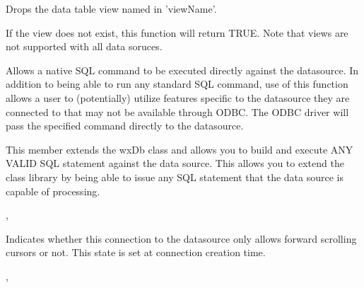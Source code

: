 \label{wxdbdropview}


Drops the data table view named in 'viewName'.




If the view does not exist, this function will return TRUE.  Note that views are not supported with all data soruces.


\label{wxdbexecsql}


Allows a native SQL command to be executed directly against the datasource.  In addition to being able to run any standard SQL command, use of this function allows a user to (potentially) utilize features specific to the datasource they are connected to that may not be available through ODBC.  The ODBC driver will pass the specified command directly to the datasource.




This member extends the wxDb class and allows you to build and execute ANY VALID
SQL statement against the data source.  This allows you to extend the class 
library by being able to issue any SQL statement that the data source is capable
of processing.


, 


\label{wxdbfwdonlycursors}


Indicates whether this connection to the datasource only allows forward scrolling cursors or not.  This state is set at connection creation time.


, 


\label{wxdbgetcatalog}

